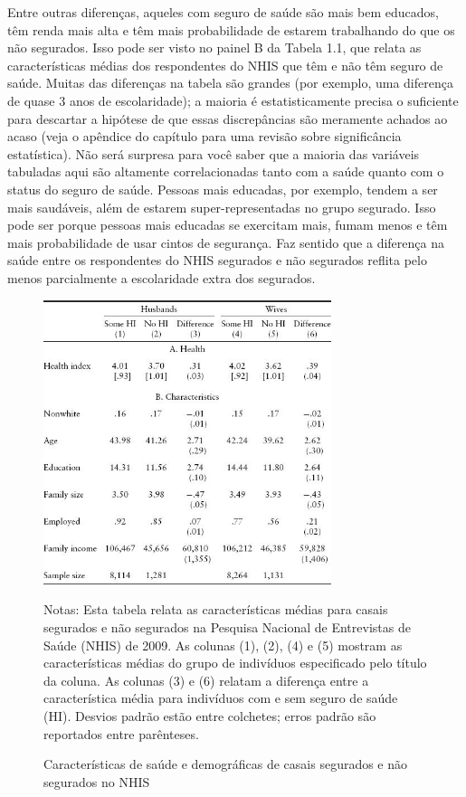 \documentclass[a4paper,12pt]{article}[abntex2]
\begin{document}
Entre outras diferenças, aqueles com seguro de saúde são mais bem educados, têm renda mais alta e têm mais probabilidade de estarem trabalhando do que os não segurados. Isso pode ser visto no painel B da Tabela 1.1, que relata as características médias dos respondentes do NHIS que têm e não têm seguro de saúde. Muitas das diferenças na tabela são grandes (por exemplo, uma diferença de quase 3 anos de escolaridade); a maioria é estatisticamente precisa o suficiente para descartar a hipótese de que essas discrepâncias são meramente achados ao acaso (veja o apêndice do capítulo para uma revisão sobre significância estatística). Não será surpresa para você saber que a maioria das variáveis tabuladas aqui são altamente correlacionadas tanto com a saúde quanto com o status do seguro de saúde. Pessoas mais educadas, por exemplo, tendem a ser mais saudáveis, além de estarem super-representadas no grupo segurado. Isso pode ser porque pessoas mais educadas se exercitam mais, fumam menos e têm mais probabilidade de usar cintos de segurança. Faz sentido que a diferença na saúde entre os respondentes do NHIS segurados e não segurados reflita pelo menos parcialmente a escolaridade extra dos segurados.


\begin{figure}[H]
    \centering
    \caption{Características de saúde e demográficas de casais segurados e não segurados no NHIS} 
    \includegraphics[width=0.75\textwidth]{PIBIC/Tradução Mater Metrics/image2.png}
    
    \footnotesize{Notas: Esta tabela relata as características médias para casais segurados e não segurados na Pesquisa Nacional de Entrevistas de Saúde (NHIS) de 2009. As colunas (1), (2), (4) e (5) mostram as características médias do grupo de indivíduos especificado pelo título da coluna. As colunas (3) e (6) relatam a diferença entre a característica média para indivíduos com e sem seguro de saúde (HI). Desvios padrão estão entre colchetes; erros padrão são reportados entre parênteses.}
    \end{figure}
\end{document}
